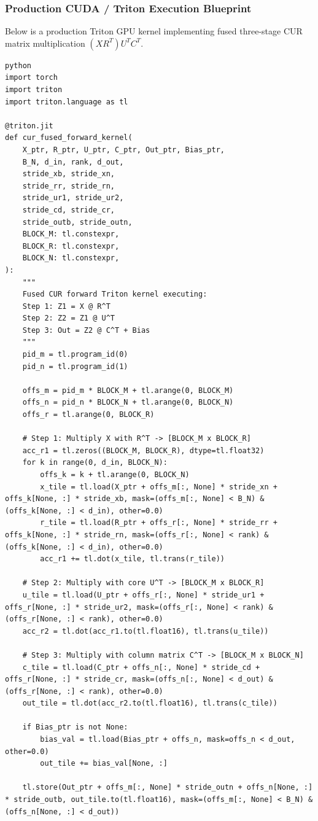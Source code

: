 \subsubsection*{Production CUDA / Triton Execution Blueprint}

Below is a production Triton GPU kernel implementing fused three-stage CUR matrix multiplication $(X R^T) U^T C^T$.

\vspace{0.5em}
\begin{mdframed}[backgroundcolor=codebg, linecolor=codeframe, linewidth=1pt, roundcorner=4pt, innerleftmargin=2pt, innerrightmargin=5pt, innertopmargin=5pt, innerbottommargin=5pt]
\begin{lstlisting}
python
import torch
import triton
import triton.language as tl

@triton.jit
def cur_fused_forward_kernel(
    X_ptr, R_ptr, U_ptr, C_ptr, Out_ptr, Bias_ptr,
    B_N, d_in, rank, d_out,
    stride_xb, stride_xn,
    stride_rr, stride_rn,
    stride_ur1, stride_ur2,
    stride_cd, stride_cr,
    stride_outb, stride_outn,
    BLOCK_M: tl.constexpr,
    BLOCK_R: tl.constexpr,
    BLOCK_N: tl.constexpr,
):
    """
    Fused CUR forward Triton kernel executing:
    Step 1: Z1 = X @ R^T
    Step 2: Z2 = Z1 @ U^T
    Step 3: Out = Z2 @ C^T + Bias
    """
    pid_m = tl.program_id(0)
    pid_n = tl.program_id(1)

    offs_m = pid_m * BLOCK_M + tl.arange(0, BLOCK_M)
    offs_n = pid_n * BLOCK_N + tl.arange(0, BLOCK_N)
    offs_r = tl.arange(0, BLOCK_R)

    # Step 1: Multiply X with R^T -> [BLOCK_M x BLOCK_R]
    acc_r1 = tl.zeros((BLOCK_M, BLOCK_R), dtype=tl.float32)
    for k in range(0, d_in, BLOCK_N):
        offs_k = k + tl.arange(0, BLOCK_N)
        x_tile = tl.load(X_ptr + offs_m[:, None] * stride_xn + offs_k[None, :] * stride_xb, mask=(offs_m[:, None] < B_N) & (offs_k[None, :] < d_in), other=0.0)
        r_tile = tl.load(R_ptr + offs_r[:, None] * stride_rr + offs_k[None, :] * stride_rn, mask=(offs_r[:, None] < rank) & (offs_k[None, :] < d_in), other=0.0)
        acc_r1 += tl.dot(x_tile, tl.trans(r_tile))

    # Step 2: Multiply with core U^T -> [BLOCK_M x BLOCK_R]
    u_tile = tl.load(U_ptr + offs_r[:, None] * stride_ur1 + offs_r[None, :] * stride_ur2, mask=(offs_r[:, None] < rank) & (offs_r[None, :] < rank), other=0.0)
    acc_r2 = tl.dot(acc_r1.to(tl.float16), tl.trans(u_tile))

    # Step 3: Multiply with column matrix C^T -> [BLOCK_M x BLOCK_N]
    c_tile = tl.load(C_ptr + offs_n[:, None] * stride_cd + offs_r[None, :] * stride_cr, mask=(offs_n[:, None] < d_out) & (offs_r[None, :] < rank), other=0.0)
    out_tile = tl.dot(acc_r2.to(tl.float16), tl.trans(c_tile))

    if Bias_ptr is not None:
        bias_val = tl.load(Bias_ptr + offs_n, mask=offs_n < d_out, other=0.0)
        out_tile += bias_val[None, :]

    tl.store(Out_ptr + offs_m[:, None] * stride_outn + offs_n[None, :] * stride_outb, out_tile.to(tl.float16), mask=(offs_m[:, None] < B_N) & (offs_n[None, :] < d_out))
\end{lstlisting}
\end{mdframed}
